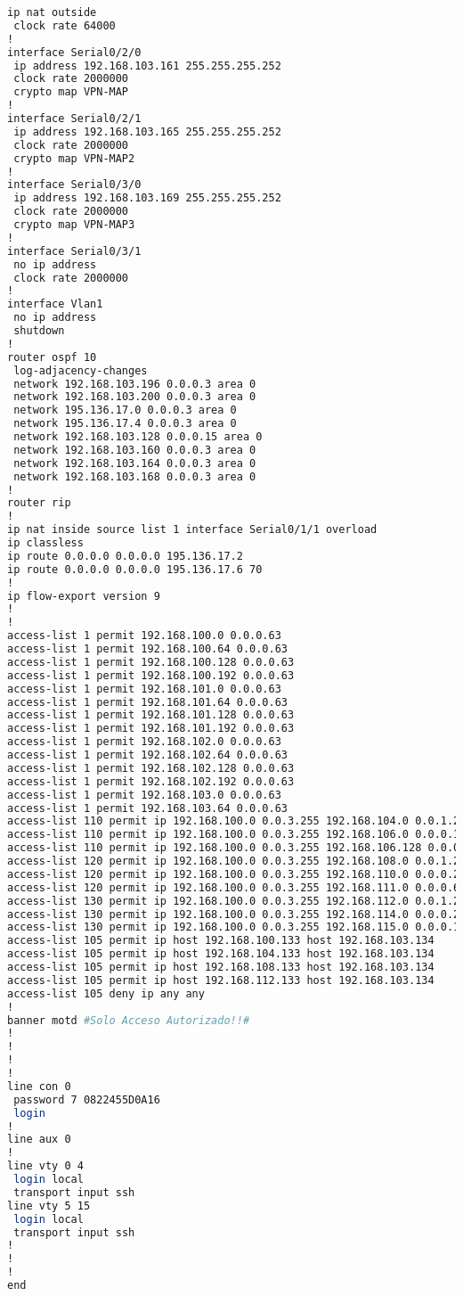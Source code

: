 \begin{lstlisting}[language=Bash, caption={Configuración Completa Router Son Espases}]
 ip nat outside
 clock rate 64000
!
interface Serial0/2/0
 ip address 192.168.103.161 255.255.255.252
 clock rate 2000000
 crypto map VPN-MAP
!
interface Serial0/2/1
 ip address 192.168.103.165 255.255.255.252
 clock rate 2000000
 crypto map VPN-MAP2
!
interface Serial0/3/0
 ip address 192.168.103.169 255.255.255.252
 clock rate 2000000
 crypto map VPN-MAP3
!
interface Serial0/3/1
 no ip address
 clock rate 2000000
!
interface Vlan1
 no ip address
 shutdown
!
router ospf 10
 log-adjacency-changes
 network 192.168.103.196 0.0.0.3 area 0
 network 192.168.103.200 0.0.0.3 area 0
 network 195.136.17.0 0.0.0.3 area 0
 network 195.136.17.4 0.0.0.3 area 0
 network 192.168.103.128 0.0.0.15 area 0
 network 192.168.103.160 0.0.0.3 area 0
 network 192.168.103.164 0.0.0.3 area 0
 network 192.168.103.168 0.0.0.3 area 0
!
router rip
!
ip nat inside source list 1 interface Serial0/1/1 overload
ip classless
ip route 0.0.0.0 0.0.0.0 195.136.17.2 
ip route 0.0.0.0 0.0.0.0 195.136.17.6 70
!
ip flow-export version 9
!
!
access-list 1 permit 192.168.100.0 0.0.0.63
access-list 1 permit 192.168.100.64 0.0.0.63
access-list 1 permit 192.168.100.128 0.0.0.63
access-list 1 permit 192.168.100.192 0.0.0.63
access-list 1 permit 192.168.101.0 0.0.0.63
access-list 1 permit 192.168.101.64 0.0.0.63
access-list 1 permit 192.168.101.128 0.0.0.63
access-list 1 permit 192.168.101.192 0.0.0.63
access-list 1 permit 192.168.102.0 0.0.0.63
access-list 1 permit 192.168.102.64 0.0.0.63
access-list 1 permit 192.168.102.128 0.0.0.63
access-list 1 permit 192.168.102.192 0.0.0.63
access-list 1 permit 192.168.103.0 0.0.0.63
access-list 1 permit 192.168.103.64 0.0.0.63
access-list 110 permit ip 192.168.100.0 0.0.3.255 192.168.104.0 0.0.1.255
access-list 110 permit ip 192.168.100.0 0.0.3.255 192.168.106.0 0.0.0.127
access-list 110 permit ip 192.168.100.0 0.0.3.255 192.168.106.128 0.0.0.63
access-list 120 permit ip 192.168.100.0 0.0.3.255 192.168.108.0 0.0.1.255
access-list 120 permit ip 192.168.100.0 0.0.3.255 192.168.110.0 0.0.0.255
access-list 120 permit ip 192.168.100.0 0.0.3.255 192.168.111.0 0.0.0.63
access-list 130 permit ip 192.168.100.0 0.0.3.255 192.168.112.0 0.0.1.255
access-list 130 permit ip 192.168.100.0 0.0.3.255 192.168.114.0 0.0.0.255
access-list 130 permit ip 192.168.100.0 0.0.3.255 192.168.115.0 0.0.0.127
access-list 105 permit ip host 192.168.100.133 host 192.168.103.134
access-list 105 permit ip host 192.168.104.133 host 192.168.103.134
access-list 105 permit ip host 192.168.108.133 host 192.168.103.134
access-list 105 permit ip host 192.168.112.133 host 192.168.103.134
access-list 105 deny ip any any
!
banner motd #Solo Acceso Autorizado!!#
!
!
!
!
line con 0
 password 7 0822455D0A16
 login
!
line aux 0
!
line vty 0 4
 login local
 transport input ssh
line vty 5 15
 login local
 transport input ssh
!
!
!
end


\end{lstlisting}

